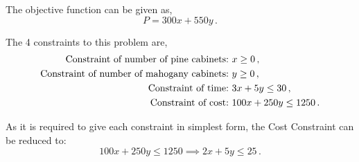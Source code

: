 %
%

\begin{subquestions}
	

\subquestion

The objective function can be given as,
\begin{equation}
	P = 300x + 550y \,.
\end{equation}


\subquestion

The 4 constraints to this problem are, 
\begin{align}
	\text{Constraint of number of pine cabinets:} & \ x \geq 0 \,, \nonumber \\
	\text{Constraint of number of mahogany cabinets:} & \ y \geq 0 \,, \nonumber \\
	\text{Constraint of time:} & \ 3x + 5y \leq 30 \,, \nonumber \\
	\text{Constraint of cost:} & \ 100x + 250y \leq 1250 \,.
\end{align}

As it is required to give each constraint in simplest form, the Cost Constraint can be reduced to:
\begin{equation}
	100x + 250y \leq 1250 \implies 2x + 5y \leq 25 \,.
\end{equation}



\end{subquestions}
